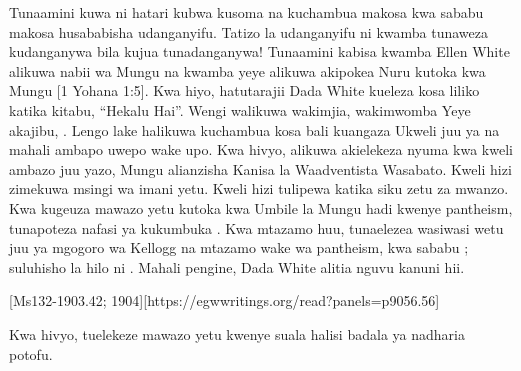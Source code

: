 Tunaamini kuwa ni hatari kubwa kusoma na kuchambua makosa kwa sababu makosa husababisha udanganyifu. Tatizo la udanganyifu ni kwamba tunaweza kudanganywa bila kujua tunadanganywa! Tunaamini kabisa kwamba Ellen White alikuwa nabii wa Mungu na kwamba yeye alikuwa akipokea Nuru kutoka kwa Mungu [1 Yohana 1:5]. Kwa hiyo, hatutarajii Dada White kueleza kosa liliko katika kitabu, “Hekalu Hai”. Wengi walikuwa wakimjia, wakimwomba  Yeye akajibu, . Lengo lake halikuwa kuchambua kosa bali kuangaza Ukweli juu ya  na mahali ambapo uwepo wake upo. Kwa hivyo, alikuwa akielekeza nyuma kwa kweli ambazo juu yazo, Mungu alianzisha Kanisa la Waadventista Wasabato. Kweli hizi zimekuwa msingi wa imani yetu. Kweli hizi tulipewa katika siku zetu za mwanzo. Kwa kugeuza mawazo yetu kutoka kwa Umbile la Mungu hadi kwenye pantheism, tunapoteza nafasi ya kukumbuka . Kwa mtazamo huu, tunaelezea wasiwasi wetu juu ya mgogoro wa Kellogg na mtazamo wake wa pantheism, kwa sababu ; suluhisho la hilo ni . Mahali pengine, Dada White alitia nguvu kanuni hii.

[Ms132-1903.42; 1904][https://egwwritings.org/read?panels=p9056.56]

Kwa hivyo, tuelekeze mawazo yetu kwenye suala halisi badala ya nadharia potofu.


